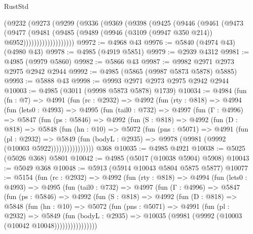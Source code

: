\begin{lexlean}{RustStd}
\begin{coremodule}
            (@9232
              (@9273
                (@9299
                  (@9336
                    (@9369
                      (@9398
                        (@9425
                          (@9446
                            (@9461
                              (@9473
                                (@9477
                                  (@9481
                                    (@9485
                                      (@9489
                                        (@9946 (@3109 (@9947 @350 @214)) @6952)))))))))))))))))))
@9972 := @4968 @43
@9976 := @5840 (@4974 @43) (@4980 @43)
@9978 := @4985 (@4919 @5851)
@9979 := @2939 @4312
@9981 := @4985 (@9979 @5860)
@9982 := @5866 @43
@9987 := @9982 @2971 @2973 @2975 @2942 @2944
@9992 := @4985 (@5865 (@9987 @5873 @5878) @5885)
@9993 := @5888 @43
@9998 := @9993 @2971 @2973 @2975 @2942 @2944
@10003 := @4985 (@3011 (@9998 @5873 @5878) @1739)
@10034 := @4984
    (fun (fn : @7) =>
    @4991
      (fun (rc : @2932) =>
      @4992
        (fun (rty : @818) =>
        @4994
          (fun (lets0 : @4993) =>
          @4995
            (fun (tail0 : @732) =>
            @4997
              (fun (Γ : @4996) =>
              @5847
                (fun (ps : @5846) =>
                @4992
                  (fun (S : @818) =>
                  @4992
                    (fun (D : @818) =>
                    @5848
                      (fun (hn : @10) =>
                      @5072
                        (fun (pns : @5071) =>
                        @4991
                          (fun (pl : @2932) =>
                          @5849
                            (fun (bodyL : @2935) =>
                            @9978 (@9981 (@9992 (@10003 @5922))))))))))))))))
    @368
@10035 := @4985 @4921
@10038 := @5025 (@5026 @368) @5801
@10042 := @4985 (@5017 (@10038 @5904) @5908)
@10043 := @5049 @368
@10048 := @5913 (@5914 @10043 @5804 @5875 @5877)
@10077 := @5154
    (fun (rc : @2932) =>
    @4992
      (fun (rty : @818) =>
      @4994
        (fun (lets0 : @4993) =>
        @4995
          (fun (tail0 : @732) =>
          @4997
            (fun (Γ : @4996) =>
            @5847
              (fun (ps : @5846) =>
              @4992
                (fun (S : @818) =>
                @4992
                  (fun (D : @818) =>
                  @5848
                    (fun (hn : @10) =>
                    @5072
                      (fun (pns : @5071) =>
                      @4991
                        (fun (pl : @2932) =>
                        @5849
                          (fun (bodyL : @2935) =>
                          @10035 (@9981 (@9992 (@10003 (@10042 @10048))))))))))))))))

\end{coremodule}
\end{lexlean}
